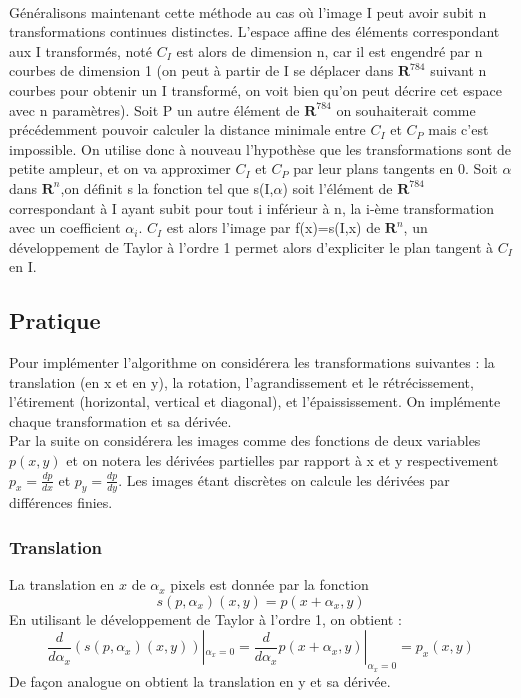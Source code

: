 \documentclass[a4paper,11pt,twoside]{report}
\begin{document}
 \\
Généralisons maintenant cette méthode au cas où l'image I peut avoir subit n transformations continues distinctes. L'espace affine des éléments correspondant aux I transformés, noté $C_{I}$ est alors de dimension n, car il est engendré par n courbes de dimension 1 (on peut à partir de I se déplacer dans $\textbf{R}^{784}$ suivant n courbes pour obtenir un I transformé, on voit bien qu'on peut décrire cet espace avec n paramètres). Soit P un autre élément de $\textbf{R}^{784}$ on souhaiterait comme précédemment pouvoir calculer la distance minimale entre $C_{I}$ et $C_{P}$ mais c'est impossible. On utilise donc à nouveau l'hypothèse que les transformations sont de petite ampleur, et on va approximer $C_{I}$ et $C_{P}$ par leur plans tangents en 0. Soit $\alpha$ dans $\textbf{R}^{n}$,on définit s la fonction tel que s(I,$\alpha$) soit l'élément de $\textbf{R}^{784}$ correspondant à I ayant subit pour tout i inférieur à n, la i-ème transformation avec un coefficient $\alpha_{i}$. $C_{I}$ est alors l'image par f(x)=s(I,x) de $\textbf{R}^{n}$, un développement de Taylor à l'ordre 1 permet alors d'expliciter le plan tangent à $C_{I}$ en I.

\subsection{Pratique}

Pour implémenter l'algorithme on considérera les transformations suivantes : la translation (en x et en y), la rotation, l'agrandissement et le rétrécissement, l'étirement (horizontal, vertical et diagonal), et l'épaississement. On implémente chaque transformation et sa dérivée.\\
Par la suite on considérera les images comme des fonctions de deux variables $p(x,y)$ et on notera les dérivées partielles par rapport à x et y respectivement $p_x = \frac{dp}{dx}$ et $p_y = \frac{dp}{dy}$. Les images étant discrètes on calcule les dérivées par différences finies. 

\subsubsection{Translation}
La translation en $x$ de $\alpha_x$ pixels est donnée par la fonction $$s(p,\alpha_x)(x,y) = p(x+\alpha_x,y)$$ 
En utilisant le développement de Taylor à l'ordre 1, on obtient :
$$\frac{d}{d\alpha_x}(s(p,\alpha_x)(x,y))|_{\alpha_x=0} = \frac{d}{d\alpha_x}p(x+\alpha_x,y)|_{\alpha_x=0}=p_x(x,y)$$ 
De façon analogue on obtient la translation en y et sa dérivée.
\end{document}

